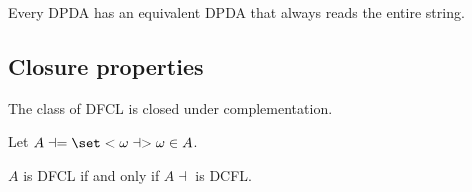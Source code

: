 \begin{lemma}
    Every DPDA has an equivalent DPDA that always reads the entire string.
\end{lemma}
\subsection{Closure properties}
\begin{theorem}
    The class of DFCL is closed under complementation.
\end{theorem}

Let \(A \dashv = \set<\omega \dashv>{\omega \in A}\). 
\begin{theorem}
     \(A\) is DFCL if and only if \(A \dashv \) is DCFL.
\end{theorem}

